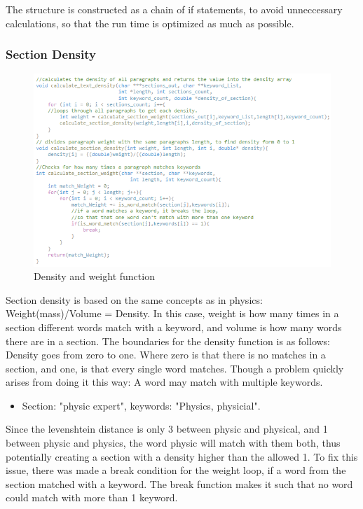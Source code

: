 The structure is constructed as a chain of if statements, to avoid unneccessary
calculations, so that the run time is optimized as much as possible.\\
\subsubsection{Section Density}
\begin{figure}[H]
  \centering
  \includegraphics[scale = 1]{figures/section_density_v2}
  \caption{Density and weight function}\label{fig:section_density_v2}
\end{figure}
Section density is based on the same concepts as in physics: Weight(mass)/Volume = Density.
In this case, weight is how many times in a section different words match with a keyword, and volume is how many words there
are in a section. The boundaries for the density function is as follows: Density goes from zero to one. 
Where zero is that there is no matches in a section, and one, is that every single word matches. Though a problem quickly arises
from doing it this way: A word may match with multiple keywords.\\
\begin{itemize}
  \item Section: "physic expert", keywords: "Physics, physicial".
\end{itemize}
Since the levenshtein distance is only 3 between physic and physical, and 1 between physic and physics,
the word physic will match with them both, thus potentially creating a section with a density higher than the allowed 1.
To fix this issue, there was made a break condition for the weight loop, if a word from the section matched with a keyword.
The break function makes it such that no word could match with more than 1 keyword.
